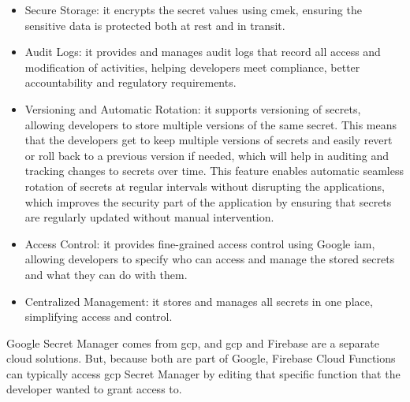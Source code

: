 \begin{multicols}{2}
      \begin{itemize}
            \item Secure Storage: it encrypts the secret values using \acrshort{cmek}, ensuring the sensitive data is protected
                  both at rest and in transit.
            \item Audit Logs: it provides and manages audit logs that record all access and modification of activities, helping
                  developers meet compliance, better accountability and regulatory requirements.
            \item Versioning and Automatic Rotation: it supports versioning of secrets, allowing developers to store multiple versions
                  of the same secret. This means that the developers get to keep multiple versions of secrets and easily revert or roll
                  back to a previous version if needed, which will help in auditing and tracking changes to secrets over time. This feature
                  enables automatic seamless rotation of secrets at regular intervals without  disrupting the applications, which improves
                  the security part of the application by ensuring that secrets are regularly updated without manual intervention.
            \item Access Control: it provides fine-grained access control using Google \acrshort{iam}, allowing developers to specify
                  who can access and manage the stored secrets and what they can do with them.
            \item Centralized Management: it stores and manages all secrets in one place, simplifying access and control.
      \end{itemize}

      Google Secret Manager comes from \acrshort{gcp}, and \acrshort{gcp} and Firebase are a separate cloud solutions. But, because
      both are part of Google, Firebase Cloud Functions can typically access \acrshort{gcp} Secret Manager by editing that specific function
      that the developer wanted to grant access to.
\end{multicols}

